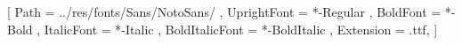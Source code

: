 \setsansfont{NotoSans}
[
	Path = ../res/fonts/Sans/NotoSans/ ,
	UprightFont = *-Regular ,
	BoldFont = *-Bold ,
	ItalicFont = *-Italic ,
	BoldItalicFont = *-BoldItalic ,
	Extension = .ttf,
]